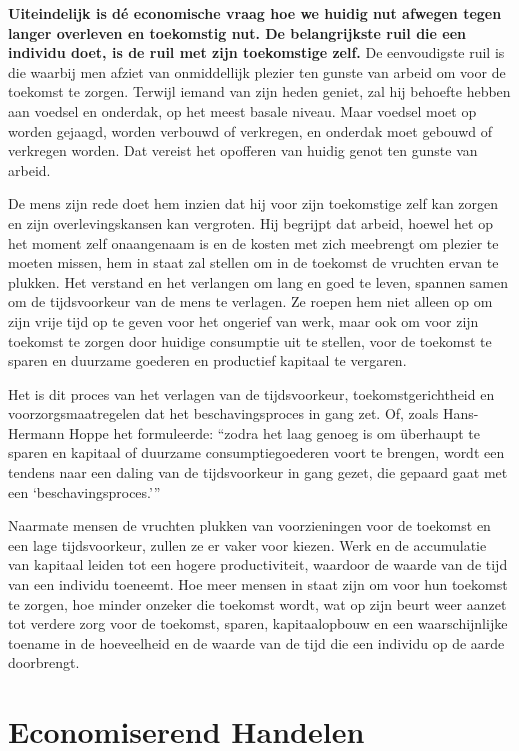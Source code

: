 \textbf{Uiteindelijk is dé economische vraag hoe we huidig nut afwegen
tegen langer overleven en toekomstig nut. De belangrijkste ruil die een
individu doet, is de ruil met zijn toekomstige zelf.} De eenvoudigste
ruil is die waarbij men afziet van onmiddellijk plezier ten gunste van
arbeid om voor de toekomst te zorgen. Terwijl iemand van zijn heden
geniet, zal hij behoefte hebben aan voedsel en onderdak, op het meest
basale niveau. Maar voedsel moet op worden gejaagd, worden verbouwd of
verkregen, en onderdak moet gebouwd of verkregen worden. Dat vereist het
opofferen van huidig genot ten gunste van arbeid.

De mens zijn rede doet hem inzien dat hij voor zijn toekomstige zelf kan
zorgen en zijn overlevingskansen kan vergroten. Hij begrijpt dat arbeid,
hoewel het op het moment zelf onaangenaam is en de kosten met zich
meebrengt om plezier te moeten missen, hem in staat zal stellen om in de
toekomst de vruchten ervan te plukken. Het verstand en het verlangen om
lang en goed te leven, spannen samen om de tijdsvoorkeur van de mens te
verlagen. Ze roepen hem niet alleen op om zijn vrije tijd op te geven
voor het ongerief van werk, maar ook om voor zijn toekomst te zorgen
door huidige consumptie uit te stellen, voor de toekomst te sparen en
duurzame goederen en productief kapitaal te vergaren.

Het is dit proces van het verlagen van de tijdsvoorkeur,
toekomstgerichtheid en voorzorgsmaatregelen dat het beschavingsproces in
gang zet. Of, zoals Hans-Hermann Hoppe het formuleerde: \enquote{zodra het laag
genoeg is om überhaupt te sparen en kapitaal of duurzame
consumptiegoederen voort te brengen, wordt een tendens naar een daling
van de tijdsvoorkeur in gang gezet, die gepaard gaat met een
`beschavingsproces.'}\autocite{36}

Naarmate mensen de vruchten plukken van voorzieningen voor de toekomst
en een lage tijdsvoorkeur, zullen ze er vaker voor kiezen. Werk en de
accumulatie van kapitaal leiden tot een hogere productiviteit, waardoor
de waarde van de tijd van een individu toeneemt. Hoe meer mensen in
staat zijn om voor hun toekomst te zorgen, hoe minder onzeker die
toekomst wordt, wat op zijn beurt weer aanzet tot verdere zorg voor de
toekomst, sparen, kapitaalopbouw en een waarschijnlijke toename in de
hoeveelheid en de waarde van de tijd die een individu op de aarde
doorbrengt.

\section{Economiserend Handelen}

